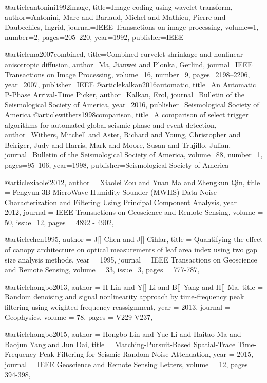 @article{antonini1992image,
  title={Image coding using wavelet transform},
  author={Antonini, Marc and Barlaud, Michel and Mathieu, Pierre and Daubechies, Ingrid},
  journal={IEEE Transactions on image processing},
  volume={1},
  number={2},
  pages={205--220},
  year={1992},
  publisher={IEEE}
}

@article{ma2007combined,
  title={Combined curvelet shrinkage and nonlinear anisotropic diffusion},
  author={Ma, Jianwei and Plonka, Gerlind},
  journal={IEEE Transactions on Image Processing},
  volume={16},
  number={9},
  pages={2198--2206},
  year={2007},
  publisher={IEEE}
}
@article{kalkan2016automatic,
  title={An Automatic P-Phase Arrival-Time Picker},
  author={Kalkan, Erol},
  journal={Bulletin of the Seismological Society of America},
  year={2016},
  publisher={Seismological Society of America}
}
@article{withers1998comparison,
  title={A comparison of select trigger algorithms for automated global seismic phase and event detection},
  author={Withers, Mitchell and Aster, Richard and Young, Christopher and Beiriger, Judy and Harris, Mark and Moore, Susan and Trujillo, Julian},
  journal={Bulletin of the Seismological Society of America},
  volume={88},
  number={1},
  pages={95--106},
  year={1998},
  publisher={Seismological Society of America}
}



@article{xiaolei2012,
  author =	 {Xiaolei Zou and Yuan Ma and Zhengkun Qin},
  title =	 {Fengyun-3B MicroWave Humidity Sounder (MWHS) Data Noise Characterization and Filtering Using Principal Component Analysis},
  year =	 2012,
  journal =	 {IEEE Transactions on Geoscience and Remote Sensing},
  volume =	 50,
  issue=12,
  pages =	 {4892 - 4902},
}

@article{chen1995,
  author =	 {J[] Chen and J[] Cihlar},
  title =	 {Quantifying the effect of canopy architecture on optical measurements of leaf area index using two gap size analysis methods},
  year =	 1995,
  journal =	 {IEEE Transactions on Geoscience and Remote Sensing},
  volume =	 33,
  issue=3,
  pages =	 {777-787},
}


@article{hongbo2013,
  author =	 {H Lin and Y[] Li and B[] Yang and H[] Ma},
  title =	 {Random denoising and signal nonlinearity approach by time-frequency peak filtering using weighted frequency reassignment},
  year =	 2013,
  journal =	 {Geophysics},
  volume =	 78,
  pages =	 {V229-V237},
}

@article{hongbo2015,
  author =	 {Hongbo Lin and Yue Li and Haitao Ma and Baojun Yang and Jun Dai},
  title =	 {Matching-Pursuit-Based Spatial-Trace Time-Frequency Peak Filtering for Seismic Random Noise Attenuation},
  year =	 2015,
  journal =	 {IEEE Geoscience and Remote Sensing Letters},
  volume =	 12,
  pages =	 {394-398},
}

